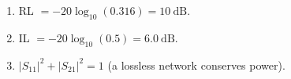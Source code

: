 \begin{enumerate}[leftmargin=1.6em,itemsep=2pt]
\item RL $= -20\log_{10}(0.316) = 10\ \text{dB}$.
\item IL $= -20\log_{10}(0.5) = 6.0\ \text{dB}$.
\item $|S_{11}|^2 + |S_{21}|^2 = 1$ (a lossless network conserves power).
\end{enumerate}
